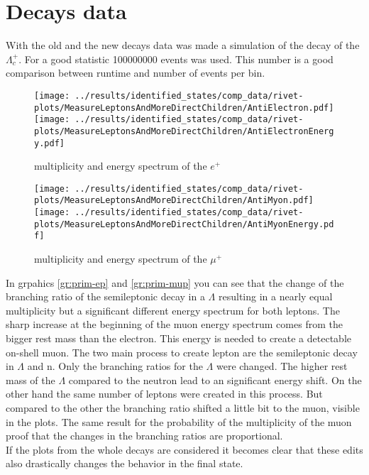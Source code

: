 \section{Decays data}
With the old and the new decays data was made a simulation of the decay of the 
\(\Lambda_c^+\). For a good statistic 100000000 events was used. This number 
is a good comparison between runtime and number of events per bin.
\begin{figure}[h]
  \centering
  \texttt{[image: ../results/identified\_states/comp\_data/rivet-plots/MeasureLeptonsAndMoreDirectChildren/AntiElectron.pdf]}
  \texttt{[image: ../results/identified\_states/comp\_data/rivet-plots/MeasureLeptonsAndMoreDirectChildren/AntiElectronEnergy.pdf]}
  \caption{multiplicity and energy spectrum of the \(e^+\)} \label{gr:prim-ep}
\end{figure}
\begin{figure}[h]
  \centering
  \texttt{[image: ../results/identified\_states/comp\_data/rivet-plots/MeasureLeptonsAndMoreDirectChildren/AntiMyon.pdf]}
  \texttt{[image: ../results/identified\_states/comp\_data/rivet-plots/MeasureLeptonsAndMoreDirectChildren/AntiMyonEnergy.pdf]}
  \caption{multiplicity and energy spectrum of the \(\mu^+\)} \label{gr:prim-mup}
\end{figure}
In grpahics {\eqref{gr:prim-ep}} and {\eqref{gr:prim-mup}} you can see that 
the change of the branching ratio of the semileptonic decay in a \(\Lambda\) 
resulting in a nearly equal multiplicity but a significant different energy 
spectrum for both leptons. The sharp increase at the beginning of the muon 
energy spectrum comes from the bigger rest mass than the electron. This energy 
is needed to create a detectable on-shell muon. The two main process to create 
lepton are the semileptonic decay in \(\Lambda\) and n. Only the branching ratios 
for the \(\Lambda\) were changed. The higher rest mass of the \(\Lambda\) compared 
to the neutron lead to an significant energy shift. On the other hand the same 
number of leptons were created in this process. But compared to the other the 
branching ratio shifted a little bit to the muon, visible in the plots. 
The same result for the probability of the multiplicity of the muon proof that 
the changes in the branching ratios are proportional.\\
If the plots from the whole decays are considered it becomes clear that these 
edits also drastically changes the behavior in the final state.
\par 
